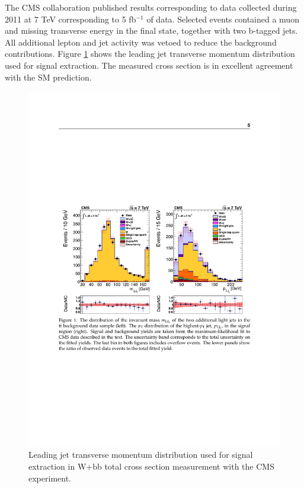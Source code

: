 \par The CMS collaboration published results corresponding to data collected during 2011 at 7 TeV corresponding to 5 fb$^{-1}$ of data. Selected events contained a muon and missing transverse energy in the final state, together with two b-tagged jets. All additional lepton and jet activity was vetoed to reduce the background contributions. Figure \ref{fig:cms_total} shows the leading jet transverse momentum distribution used for signal extraction. The measured cross section is in excellent agreement with the SM prediction. \cite{Chatrchyan:2013uza}

\begin{figure}[htbp]
	\centering
		\includegraphics{Figures/cms_tot.pdf}
	\caption[CMS Wbb total cross section measurement]{Leading jet transverse momentum distribution used for signal extraction in W+bb  total cross section measurement with the CMS experiment. \cite{Chatrchyan:2013uza} }
	\label{fig:cms_total}
\end{figure}